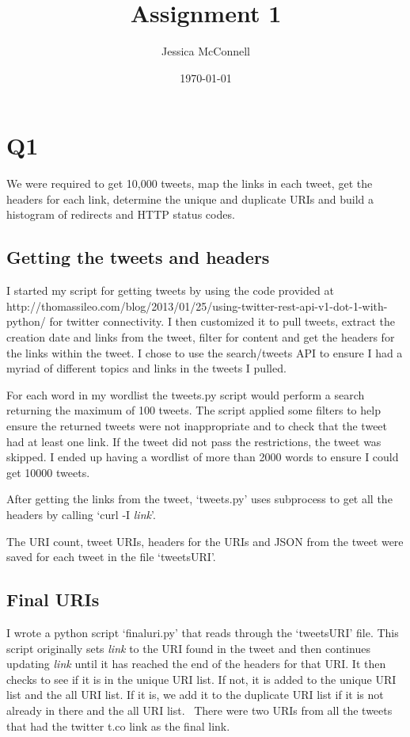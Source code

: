 \documentclass[12pt]{report}
\title{Assignment 1}
\author{Jessica McConnell}
\date{\today}
\begin{document}
\maketitle

\section*{Q1}

We were required to get 10,000 tweets, map the links in each tweet, get the headers for each link, determine the unique and duplicate URIs and build a histogram of redirects and HTTP status codes.

\subsection*{Getting the tweets and headers}

I started my script for getting tweets by using the code provided at http://thomassileo.com/blog/2013/01/25/using-twitter-rest-api-v1-dot-1-with-python/ for twitter connectivity.  I then customized it to pull tweets, extract the creation date and links from the tweet, filter for content and get the headers for the links within the tweet.  I chose to use the search/tweets API to ensure I had a myriad of different topics and links in the tweets I pulled.

For each word in my wordlist the tweets.py script would perform a search returning the maximum of 100 tweets.  The script applied some filters to help ensure the returned tweets were not inappropriate and to check that the tweet had at least one link.  If the tweet did not pass the restrictions, the tweet was skipped.  I ended up having a wordlist of more than 2000 words to ensure I could get 10000 tweets.

After getting the links from the tweet, `tweets.py' uses subprocess to get all the headers by calling `curl -I \textit{link}'.

The URI count, tweet URIs, headers for the URIs and JSON from the tweet were saved for each tweet in the file `tweetsURI'.

\subsection*{Final URIs}

I wrote a python script `finaluri.py' that reads through the `tweetsURI' file.  This script originally sets \textit{link} to the URI found in the tweet and then continues updating \textit{link} until it has reached the end of the headers for that URI.  It then checks to see if it is in the unique URI list.  If not, it is added to the unique URI list and the all URI list.  If it is, we add it to the duplicate URI list if it is not already in there and the all URI list.
\
There were two URIs from all the tweets that had the twitter t.co link as the final link.
\end{document}
